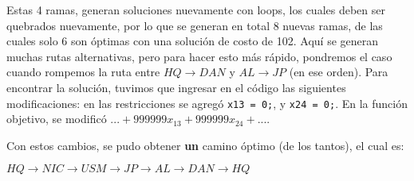 \documentclass[12pt,letterpaper]{article}
\begin{document}
Estas 4 ramas, generan soluciones nuevamente con loops, los cuales deben ser quebrados nuevamente, por lo que se generan en total 8 nuevas ramas, de las cuales solo 6 son óptimas con una solución de costo de 102. Aquí se generan muchas rutas alternativas, pero para hacer esto más rápido, pondremos el caso cuando rompemos la ruta entre $HQ \to DAN$ y $AL \to JP$ (en ese orden).
\newpage
Para encontrar la solución, tuvimos que ingresar en el código las siguientes modificaciones: en las restricciones se agregó \verb+x13 = 0;+, y \verb+x24 = 0;+. En la función objetivo, se modificó $... + 999999 x_{13} + 999999 x_{24} + ...$.

Con estos cambios, se pudo obtener \textbf{un} camino óptimo (de los tantos), el cual es:
\begin{center}$HQ \to NIC \to USM \to JP \to AL \to DAN \to HQ$\end{center}




\end{document}
